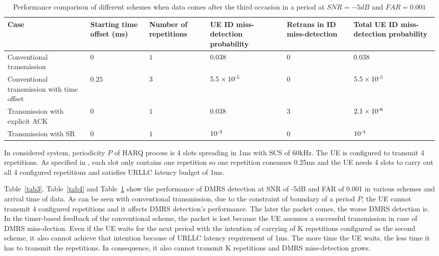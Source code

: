 \documentclass[conference]{IEEEtran}
\begin{document}
\begin{table}[htbp]
\caption{Performance comparison of different schemes when data comes after the third occasion in a period at $SNR = -5dB$ and $FAR = 0.001$}
\begin{center}
\begin{tabular}{|p{5em}|p{3em}|p{3em}|p{3.2em}|p{3em}|p{3.2em}|}
 \hline
 \textbf{Case} & \textbf{Starting time offset (ms)}&\textbf{Number of repetitions}&\textbf{UE ID miss-detection probability}&\textbf{Retrans in ID miss-detection}&\textbf{Total UE ID miss-detection probability}\\
 \hline
 Conventional transmission&$0$&$1$&$0.038$&$0$&$0.038$\\
 \hline
 Conventional transmission with time offset&$0.25$&$3$&$5.5\times10\textsuperscript{-5}$&$0$&$5.5\times10\textsuperscript{-5}$\\
 \hline
Transmission with explicit ACK&$0$&$1$&$0.038$&$3$&$2.1\times10\textsuperscript{-6}$\\
\hline
Transmission with SR&$0$&$1$&$10\textsuperscript{-3}$&$0$&$10\textsuperscript{-3}$\\
 \hline
\end{tabular}
\label{tab5}
\end{center}
\vspace{-7mm}
\end{table}

In considered system, periodicity $P$ of HARQ process is 4 slots spreading in 1ms with SCS of 60kHz. The UE is configured to transmit 4 repetitions. As specified in \cite{ad2}, each slot only contains one repetition so one repetition consumes 0.25ms and the UE needs 4 slots to carry out all 4 configured repetitions and satisfies URLLC latency budget of 1ms.

Table~\ref{tab3}, Table~\ref{tab4} and Table~\ref{tab5} show the performance of DMRS detection at SNR of -5dB and FAR of 0.001 in various schemes and arrival time of data. As can be seen with conventional  transmission, due to the constraint of boundary of a period $P$, the UE cannot transmit 4 configured repetitions and it affects DMRS detection's performance. The later the packet comes, the worse DMRS detection is. In the timer-based feedback of the conventional scheme, the packet is lost because the UE assumes a successful transmission in case of DMRS miss-dection. Even if the UE waits for the next period with the intention of carrying of K repetitions configured as the second scheme, it also cannot achieve that intention because of URLLC latency requirement of 1ms. The more time the UE waits, the less time it has to transmit the repetitions. In consequence, it also cannot transmit K repetitions and DMRS miss-detection grows.
\end{document}
